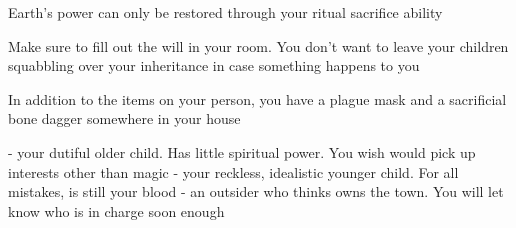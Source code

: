 \documentclass[char]{guildcamp4}
\begin{document}
\begin{itemz}[Notes]
	\item Earth's power can only be restored through your ritual sacrifice ability
	\item Make sure to fill out the will in your room. You don't want to leave your children squabbling over your inheritance in case something happens to you
	\item In addition to the items on your person, you have a plague mask and a sacrificial bone dagger somewhere in your house
\end{itemz}

\begin{contacts}
	\contact{\cApprentice{}} - your dutiful older child. Has little spiritual power. You wish \cApprentice{\they} would pick up interests other than magic  
	\contact{\cRebel{}} - your reckless, idealistic younger child. For all \cRebel{\their} mistakes, \cRebel{\they} is still your blood 
	\contact{\cOutsider{}} - an outsider who thinks \cOutsider{\they} owns the town. You will let \cOutsider{\them} know who is in charge soon enough
\end{contacts}
\end{document}
